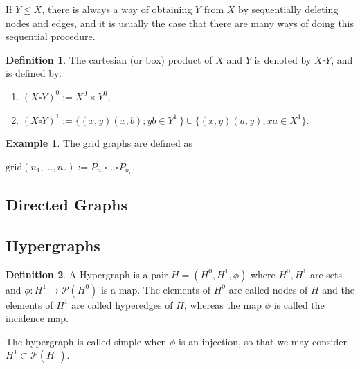 \documentclass[]{article}
\theoremstyle{definition}
\newtheorem{definition}{Definition}[section]
\theoremstyle{definition}
\newtheorem{exmp}{Example}[section]
\newcommand{\raw}{\rightarrow}
\begin{document}
	If $Y \leq X$, there is always a way of obtaining $Y$ from $X$ by sequentially deleting nodes and edges, and it is usually the case that there are many ways of doing this sequential procedure.
	
	
	\begin{definition}
		The cartesian (or box) product of $X$ and $Y$ is denoted by $X \square Y$, and is defined by:
		
		\begin{enumerate}
			\item $(X \square Y)^0 := X^0 \times Y^0$,
			
			\item $(X \square Y)^1 := \{(x,y)(x,b); yb  \in Y^1\ \} \cup \{(x,y)(a,y); xa \in X^1\}$.
		\end{enumerate}
	\end{definition}
	
	\begin{exmp}
		The grid graphs are defined as 
		\begin{center}
			$\text{grid}(n_1, ..., n_r) := P_{n_1}\square ... \square P_{n_r}$.
		\end{center}
	\end{exmp}
	
	\subsection{Directed Graphs}
	
	
	\subsection{Hypergraphs}
	
	\begin{definition}
		A Hypergraph is a pair $H=(H^0, H^1, \phi)$ where $H^0, H^1$ are sets and $\phi: H^1 \raw \mathcal{P}(H^0)$ is a map. The elements of $H^0$ are called nodes of $H$ and the elements of $H^1$ are called hyperedges of $H$, whereas the map $\phi$ is called the incidence map.
		
		The hypergraph is called simple when $\phi$ is an injection, so that we may consider $H^1 \subset \mathcal{P}(H^0)$.
	\end{definition}
	
\end{document}
